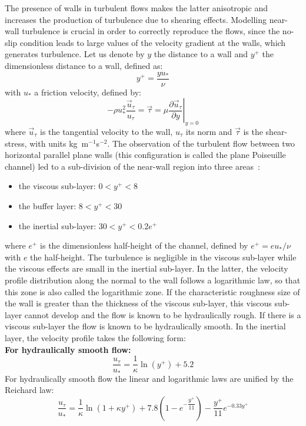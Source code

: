 The presence of walls in turbulent flows makes the
latter anisotropic and increases the production of turbulence due to shearing effects.
Modelling near-wall turbulence is crucial in order to correctly reproduce the flows,
since the no-slip condition leads to large values of the velocity gradient at the walls,
which generates turbulence.
Let us denote by $y$ the distance to a wall and $y^+$ the dimensionless distance to a wall, defined as:
\begin{equation}\label{eq:yPlus}
  y^+=\dfrac{y u_*}{\nu}
\end{equation}
with $u_*$ a friction velocity, defined by:
\begin{equation}
  -\rho u_*^2\dfrac{\vec{u}_\tau}{u_\tau} = \vec{\tau} = \mu \left.\dfrac{\partial \vec{u}_\tau}{\partial y}\right|_{y=0}
\end{equation}
where $\vec{u}_\tau$ is the tangential velocity to the wall, $u_\tau$ its norm and $\vec{\tau}$ is the shear-stress,
with units \mbox{kg m$^{-1}$s$^{-2}$}.
The observation of the turbulent flow between two horizontal parallel plane walls (this configuration is called the plane Poiseuille channel)
led to a sub-division of the near-wall region into three areas~\cite{Viollet2002}:
\begin{itemize}
\item the viscous sub-layer: $0<y^+<8$
\item the buffer layer: $8<y^+<30$
\item the inertial sub-layer: $30<y^+<0.2e^+$
\end{itemize}
where $e^+$ is the dimensionless half-height of the channel, defined by $e^+=e u_{*}/\nu$ with $e$ the half-height.
The turbulence is negligible in the viscous sub-layer while the viscous effects are small in the inertial sub-layer.
In the latter, the velocity profile distribution along the normal to the wall follows a logarithmic law, so that this zone is also called the logarithmic zone.
If the characteristic roughness size of the wall is greater
than the thickness of the viscous sub-layer, this viscous sub-layer cannot
develop and the flow is known to be hydraulically rough. If there is a viscous
sub-layer the flow is known to be hydraulically smooth.
In the inertial layer, the velocity profile takes the following form:\\

\textbf{For hydraulically smooth flow:}
\begin{equation}
  \dfrac{u_\tau}{u_*}=\dfrac{1}{\kappa}\ln\left(y^+\right)+5.2 \label{logarsmooth}
\end{equation}
For hydraulically smooth flow the linear and logarithmic laws are unified by
the Reichard law:
\begin{equation}
  \dfrac{u_\tau}{u_*}=\dfrac{1}{\kappa}\ln(1+\kappa y^{+})+7.8(1-e^{-\dfrac{y^{+}%
    }{11}})-\dfrac{y^{+}}{11}e^{-0.33y^{+}} \label{REICHARD}%
\end{equation}

